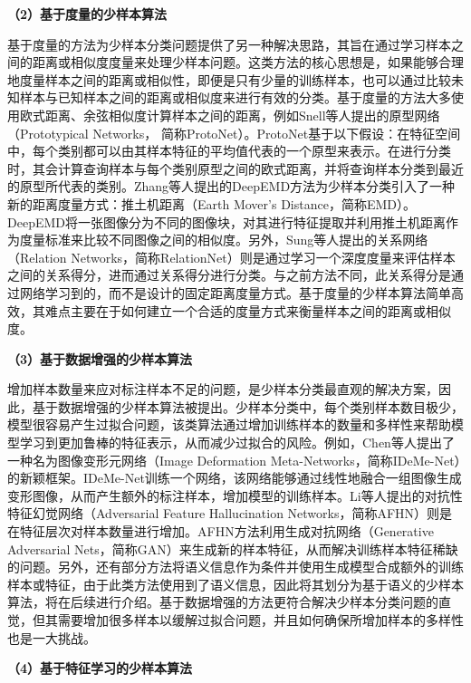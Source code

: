 \textbf{（2）基于度量的少样本算法}

基于度量的方法\cite{ProtoNet, vinyals2016matching, DeepEMD, 度量学习}为少样本分类问题提供了另一种解决思路，其旨在通过学习样本之间的距离或相似度度量来处理少样本问题。这类方法的核心思想是，如果能够合理地度量样本之间的距离或相似性，即便是只有少量的训练样本，也可以通过比较未知样本与已知样本之间的距离或相似度来进行有效的分类。基于度量的方法大多使用欧式距离、余弦相似度计算样本之间的距离，例如Snell等人\cite{ProtoNet}提出的原型网络（Prototypical Networks， 简称ProtoNet）。ProtoNet基于以下假设：在特征空间中，每个类别都可以由其样本特征的平均值代表的一个原型来表示。在进行分类时，其会计算查询样本与每个类别原型之间的欧式距离，并将查询样本分类到最近的原型所代表的类别。Zhang等人\cite{DeepEMD}提出的DeepEMD方法为少样本分类引入了一种新的距离度量方式：推土机距离（Earth Mover's Distance，简称EMD）。DeepEMD将一张图像分为不同的图像块，对其进行特征提取并利用推土机距离作为度量标准来比较不同图像之间的相似度。另外，Sung等人\cite{RelationNet}提出的关系网络（Relation Networks，简称RelationNet）则是通过学习一个深度度量来评估样本之间的关系得分，进而通过关系得分进行分类。与之前方法不同，此关系得分是通过网络学习到的，而不是设计的固定距离度量方式。基于度量的少样本算法简单高效，其难点主要在于如何建立一个合适的度量方式来衡量样本之间的距离或相似度。

\textbf{（3）基于数据增强的少样本算法}

增加样本数量来应对标注样本不足的问题，是少样本分类最直观的解决方案，因此，基于数据增强的少样本算法被提出\cite{IDeMe-Net, AFHN}。少样本分类中，每个类别样本数目极少，模型很容易产生过拟合问题，该类算法通过增加训练样本的数量和多样性来帮助模型学习到更加鲁棒的特征表示，从而减少过拟合的风险。例如，Chen等人\cite{IDeMe-Net}提出了一种名为图像变形元网络（Image Deformation Meta-Networks，简称IDeMe-Net）的新颖框架。IDeMe-Net训练一个网络，该网络能够通过线性地融合一组图像生成变形图像，从而产生额外的标注样本，增加模型的训练样本。Li等人\cite{AFHN}提出的对抗性特征幻觉网络（Adversarial Feature Hallucination Networks，简称AFHN）则是在特征层次对样本数量进行增加。AFHN方法利用生成对抗网络（Generative Adversarial Nets，简称GAN）\cite{GAN}来生成新的样本特征，从而解决训练样本特征稀缺的问题。另外，还有部分方法将语义信息作为条件并使用生成模型合成额外的训练样本或特征，由于此类方法使用到了语义信息，因此将其划分为基于语义的少样本算法，将在后续进行介绍。基于数据增强的方法更符合解决少样本分类问题的直觉，但其需要增加很多样本以缓解过拟合问题，并且如何确保所增加样本的多样性也是一大挑战。

\textbf{（4）基于特征学习的少样本算法}

